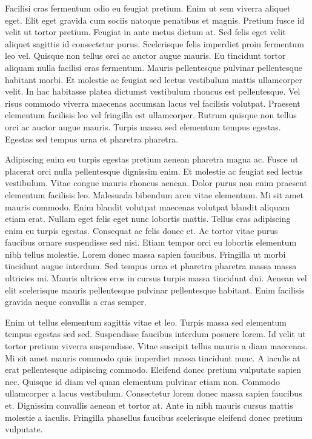 \documentclass[11pt,a4paper]{article}
\begin{document}
Facilisi cras fermentum odio eu feugiat pretium. Enim ut sem viverra aliquet eget. Elit eget gravida cum sociis natoque penatibus et magnis. Pretium fusce id velit ut tortor pretium. Feugiat in ante metus dictum at. Sed felis eget velit aliquet sagittis id consectetur purus. Scelerisque felis imperdiet proin fermentum leo vel. Quisque non tellus orci ac auctor augue mauris. Eu tincidunt tortor aliquam nulla facilisi cras fermentum. Mauris pellentesque pulvinar pellentesque habitant morbi. Et molestie ac feugiat sed lectus vestibulum mattis ullamcorper velit. In hac habitasse platea dictumst vestibulum rhoncus est pellentesque. Vel risus commodo viverra maecenas accumsan lacus vel facilisis volutpat. Praesent elementum facilisis leo vel fringilla est ullamcorper. Rutrum quisque non tellus orci ac auctor augue mauris. Turpis massa sed elementum tempus egestas. Egestas sed tempus urna et pharetra pharetra.

Adipiscing enim eu turpis egestas pretium aenean pharetra magna ac. Fusce ut placerat orci nulla pellentesque dignissim enim. Et molestie ac feugiat sed lectus vestibulum. Vitae congue mauris rhoncus aenean. Dolor purus non enim praesent elementum facilisis leo. Malesuada bibendum arcu vitae elementum. Mi sit amet mauris commodo. Enim blandit volutpat maecenas volutpat blandit aliquam etiam erat. Nullam eget felis eget nunc lobortis mattis. Tellus cras adipiscing enim eu turpis egestas. Consequat ac felis donec et. Ac tortor vitae purus faucibus ornare suspendisse sed nisi. Etiam tempor orci eu lobortis elementum nibh tellus molestie. Lorem donec massa sapien faucibus. Fringilla ut morbi tincidunt augue interdum. Sed tempus urna et pharetra pharetra massa massa ultricies mi. Mauris ultrices eros in cursus turpis massa tincidunt dui. Aenean vel elit scelerisque mauris pellentesque pulvinar pellentesque habitant. Enim facilisis gravida neque convallis a cras semper.

Enim ut tellus elementum sagittis vitae et leo. Turpis massa sed elementum tempus egestas sed sed. Suspendisse faucibus interdum posuere lorem. Id velit ut tortor pretium viverra suspendisse. Vitae suscipit tellus mauris a diam maecenas. Mi sit amet mauris commodo quis imperdiet massa tincidunt nunc. A iaculis at erat pellentesque adipiscing commodo. Eleifend donec pretium vulputate sapien nec. Quisque id diam vel quam elementum pulvinar etiam non. Commodo ullamcorper a lacus vestibulum. Consectetur lorem donec massa sapien faucibus et. Dignissim convallis aenean et tortor at. Ante in nibh mauris cursus mattis molestie a iaculis. Fringilla phasellus faucibus scelerisque eleifend donec pretium vulputate.
\end{document}
